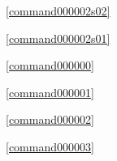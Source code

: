 ﻿



\noindent\commandnumbernameone\ \ref{command000002s02}\dotfill\pageref{command000002s02}%

\noindent\commandnumbernameone\ \ref{command000002s01}\dotfill\pageref{command000002s01}%

\noindent\commandnumbernameone\ \ref{command000000}\dotfill\pageref{command000000}%

\noindent\commandnumbernameone\ \ref{command000001}\dotfill\pageref{command000001}%

\noindent\commandnumbernameone\ \ref{command000002}\dotfill\pageref{command000002}%

\noindent\commandnumbernameone\ \ref{command000003}\dotfill\pageref{command000003}%









